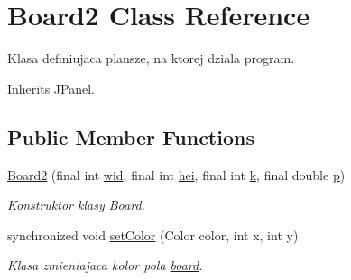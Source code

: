 \hypertarget{classBoard2}{\section{Board2 Class Reference}
\label{classBoard2}
}


Klasa definiujaca plansze, na ktorej dziala program.  




Inherits J\-Panel.

\subsection*{Public Member Functions}
\begin{DoxyCompactItemize}
\item 
\hyperlink{classBoard2_ad33bfb04a336742d3f6f1636490c899d}{Board2} (final int \hyperlink{classBoard2_a7873fa80bb562ba0ce7c93f76eddc8f3}{wid}, final int \hyperlink{classBoard2_a465a4d61359fc92c11cafdd8d0745ec0}{hei}, final int \hyperlink{classBoard2_a0c416dfe261333a6ef3dcd7f7b38b234}{k}, final double \hyperlink{classBoard2_a697bd8c3fd4b418c6570a9ad6c6dfdf9}{p})
\begin{DoxyCompactList}\small\item\em Konstruktor klasy Board. \end{DoxyCompactList}\item 
synchronized void \hyperlink{classBoard2_a704747614afe2d92dc86f8458ee30282}{set\-Color} (Color color, int x, int y)
\begin{DoxyCompactList}\small\item\em Klasa zmieniajaca kolor pola \hyperlink{classBoard2}{board}. \end{DoxyCompactList}\end{DoxyCompactItemize}
